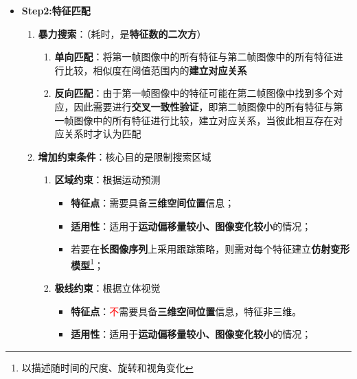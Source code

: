 \documentclass[../main.tex]{subfiles}
\begin{document}
\begin{enumerate}
\begin{itemize}
\begin{enumerate}
\begin{itemize}
                    \item \textbf{Step2:特征匹配}
                        \begin{enumerate}
                            \item \textbf{暴力搜索}：（耗时，是\textbf{特征数的二次方}）
                                \begin{enumerate}
                                    \item \textbf{单向匹配}：将第一帧图像中的所有特征与第二帧图像中的所有特征进行比较，相似度在阈值范围内的\textbf{建立对应关系}
                                    \item \textbf{反向匹配}：由于第一帧图像中的特征可能在第二帧图像中找到多个对应，因此需要进行\textbf{交叉一致性验证}，即第二帧图像中的所有特征与第一帧图像中的所有特征进行比较，建立对应关系，当彼此相互存在对应关系时才认为匹配
                                \end{enumerate}
                            \item \textbf{增加约束条件}：核心目的是限制搜索区域
                            \begin{enumerate}
                                \item \textbf{区域约束}：根据运动预测
                                \begin{itemize}
                                    \item \textbf{特征点}：需要具备\textbf{三维空间位置}信息；
                                    \item \textbf{适用性}：适用于\textbf{运动偏移量较小、图像变化较小}的情况；
                                    \item 若要在\textbf{长图像序列}上采用跟踪策略，则需对每个特征建立\textbf{仿射变形模型}\footnote{以描述随时间的尺度、旋转和视角变化}；
                                \end{itemize}
                                \item \textbf{极线约束}：根据立体视觉
                                \begin{itemize}
                                    \item \textbf{特征点}：\textcolor{red}{不}需要具备\textbf{三维空间位置}信息，特征非三维。
                                    \item \textbf{适用性}：适用于\textbf{运动偏移量较小、图像变化较小}的情况；
                                \end{itemize}
                                                \begin{figure}[H]

\end{figure}
\end{enumerate}
\end{enumerate}
\end{itemize}
\end{enumerate}
\end{itemize}
\end{enumerate}
\end{document}
